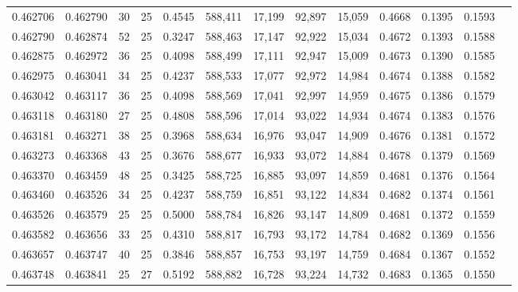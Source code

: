 \begin{tabular}{rrrrrrrrrrrrr}
0.462706 & 0.462790 &    30 &  25 &                                     0.4545 & 588,411 &  17,199 &  92,897 &  15,059 & 0.4668 & 0.1395 & 0.1593 \\
0.462790 & 0.462874 &    52 &  25 &                                     0.3247 & 588,463 &  17,147 &  92,922 &  15,034 & 0.4672 & 0.1393 & 0.1588 \\
0.462875 & 0.462972 &    36 &  25 &                                     0.4098 & 588,499 &  17,111 &  92,947 &  15,009 & 0.4673 & 0.1390 & 0.1585 \\
0.462975 & 0.463041 &    34 &  25 &                                     0.4237 & 588,533 &  17,077 &  92,972 &  14,984 & 0.4674 & 0.1388 & 0.1582 \\
0.463042 & 0.463117 &    36 &  25 &                                     0.4098 & 588,569 &  17,041 &  92,997 &  14,959 & 0.4675 & 0.1386 & 0.1579 \\
0.463118 & 0.463180 &    27 &  25 &                                     0.4808 & 588,596 &  17,014 &  93,022 &  14,934 & 0.4674 & 0.1383 & 0.1576 \\
0.463181 & 0.463271 &    38 &  25 &                                     0.3968 & 588,634 &  16,976 &  93,047 &  14,909 & 0.4676 & 0.1381 & 0.1572 \\
0.463273 & 0.463368 &    43 &  25 &                                     0.3676 & 588,677 &  16,933 &  93,072 &  14,884 & 0.4678 & 0.1379 & 0.1569 \\
0.463370 & 0.463459 &    48 &  25 &                                     0.3425 & 588,725 &  16,885 &  93,097 &  14,859 & 0.4681 & 0.1376 & 0.1564 \\
0.463460 & 0.463526 &    34 &  25 &                                     0.4237 & 588,759 &  16,851 &  93,122 &  14,834 & 0.4682 & 0.1374 & 0.1561 \\
0.463526 & 0.463579 &    25 &  25 &                                     0.5000 & 588,784 &  16,826 &  93,147 &  14,809 & 0.4681 & 0.1372 & 0.1559 \\
0.463582 & 0.463656 &    33 &  25 &                                     0.4310 & 588,817 &  16,793 &  93,172 &  14,784 & 0.4682 & 0.1369 & 0.1556 \\
0.463657 & 0.463747 &    40 &  25 &                                     0.3846 & 588,857 &  16,753 &  93,197 &  14,759 & 0.4684 & 0.1367 & 0.1552 \\
0.463748 & 0.463841 &    25 &  27 &                                     0.5192 & 588,882 &  16,728 &  93,224 &  14,732 & 0.4683 & 0.1365 & 0.1550 \\

\end{tabular}
